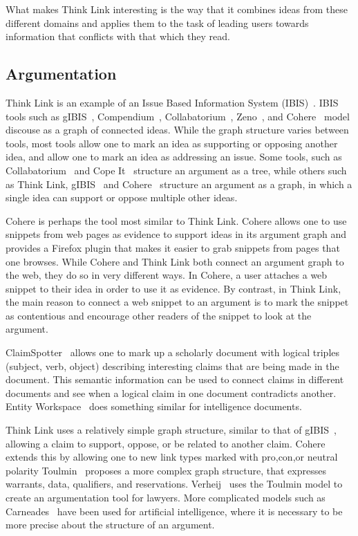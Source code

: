 \documentclass{chi2009}
\begin{document}
What makes Think Link interesting is the way that it combines ideas from these different domains and applies them to the task of leading users towards information that conflicts with that which they read.

\subsection{Argumentation}

Think Link is an example of an Issue Based Information System (IBIS)~\cite{Rittel1973}. IBIS tools such as gIBIS~\cite{Conklin1987a}, Compendium~\cite{Selvin2001}, Collabatorium~\cite{Klein2007}, Zeno~\cite{Gordon1997}, and Cohere~\cite{Shum2008} model discouse as a graph of connected ideas. While the graph structure varies between tools, most tools allow one to mark an idea as supporting or opposing another idea, and allow one to mark an idea as addressing an issue. Some tools, such as Collabatorium~\cite{Klein2007} and Cope It~\cite{Karacapilidis2001} structure an argument as a tree, while others such as Think Link, gIBIS~\cite{Conklin1987a} and Cohere~\cite{Shum2008} structure an argument as a graph, in which a single idea can support or oppose multiple other ideas.

Cohere is perhaps the tool most similar to Think Link. Cohere allows one to use snippets from web pages as evidence to support ideas in its argument graph and provides a Firefox plugin that makes it easier to grab snippets from pages that one browses. While Cohere and Think Link both connect an argument graph to the web, they do so in very different ways. In Cohere, a user attaches a web snippet to their idea in order to use it as evidence. By contrast, in Think Link, the main reason to connect a web snippet to an argument is to mark the snippet as contentious and encourage other readers of the snippet to look at the argument. 

ClaimSpotter~\cite{Sereno2005,Sereno2004} allows one to mark up a scholarly document with logical triples (subject, verb, object) describing interesting claims that are being made in the document. This semantic information can be used to connect claims in different documents and see when a logical claim in one document contradicts another. Entity Workspace~\cite{Bier2006} does something similar for intelligence documents.  

Think Link uses a relatively simple graph structure, similar to that of gIBIS~\cite{Conklin1987a}, allowing a claim to support, oppose, or be related to another claim. Cohere~\cite{Shum2008} extends this by allowing one to new link types marked with pro,con,or neutral polarity Toulmin~\cite{toulmin1958} proposes a more complex graph structure, that expresses warrants, data, qualifiers, and reservations. Verheij~\cite{Verheij1999} uses the Toulmin model to create an argumentation tool for lawyers. More complicated models such as Carneades~\cite{Gordon2007} have been used for artificial intelligence, where it is necessary to be more precise about the structure of an argument.
\end{document}

